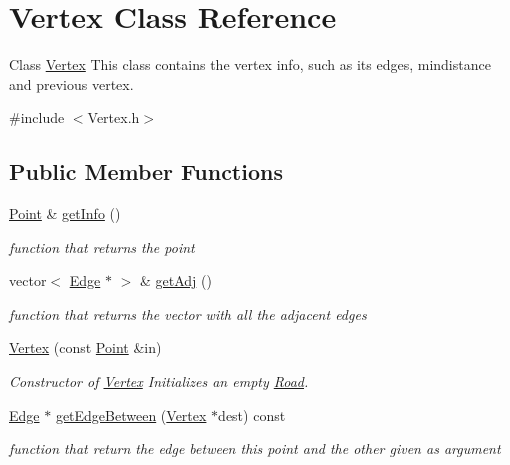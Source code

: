 \hypertarget{class_vertex}{}\section{Vertex Class Reference}
\label{class_vertex}


Class \hyperlink{class_vertex}{Vertex} This class contains the vertex info, such as its edges, mindistance and previous vertex.  




{\ttfamily \#include $<$Vertex.\+h$>$}

\subsection*{Public Member Functions}
\begin{DoxyCompactItemize}
\item 
\hyperlink{class_point}{Point} \& \hyperlink{class_vertex_ad14b55aeaf32f8fccca64928bf00da35}{get\+Info} ()
\begin{DoxyCompactList}\small\item\em function that returns the point \end{DoxyCompactList}\item 
vector$<$ \hyperlink{class_edge}{Edge} $\ast$ $>$ \& \hyperlink{class_vertex_ae201ccd5215730e9ca67a146ebadbd8f}{get\+Adj} ()
\begin{DoxyCompactList}\small\item\em function that returns the vector with all the adjacent edges \end{DoxyCompactList}\item 
\hyperlink{class_vertex_a9851482e39d2aacb7640ece7e7d6cdad}{Vertex} (const \hyperlink{class_point}{Point} \&in)
\begin{DoxyCompactList}\small\item\em Constructor of \hyperlink{class_vertex}{Vertex} Initializes an empty \hyperlink{class_road}{Road}. \end{DoxyCompactList}\item 
\hyperlink{class_edge}{Edge} $\ast$ \hyperlink{class_vertex_a611c3438f35378fe1848f28656712b01}{get\+Edge\+Between} (\hyperlink{class_vertex}{Vertex} $\ast$dest) const 
\begin{DoxyCompactList}\small\item\em function that return the edge between this point and the other given as argument \end{DoxyCompactList}\item 

\end{DoxyCompactItemize}
